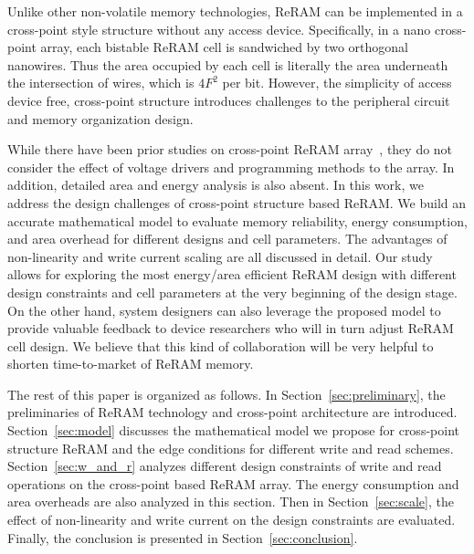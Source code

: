 Unlike other non-volatile memory technologies, ReRAM can be implemented in
a cross-point style structure without any access device. Specifically, in
a nano cross-point array, each bistable ReRAM cell is sandwiched by two
orthogonal nanowires. Thus the area occupied by each cell is literally the
area underneath the intersection of wires, which is $4F^2$ per bit.
However, the simplicity of access device free, cross-point structure
introduces challenges to the peripheral circuit and memory organization
design.

While there have been prior studies on cross-point ReRAM
array~\cite{crossbar_NANO2002_Ziegler,crossbar_NANO08_Flocke,crossbar_TED_2010,crossbar_NANO2003_Ziegler},
they do not consider the effect of voltage drivers and programming methods
to the array. In addition, detailed area and energy analysis is also
absent. In this work, we address the design challenges of cross-point
structure based ReRAM. We build an accurate mathematical model to evaluate
memory reliability, energy consumption, and area overhead for different
designs and cell parameters. The advantages of non-linearity and write
current scaling are all discussed in detail. Our study allows for
exploring the most energy/area efficient ReRAM design with different
design constraints and cell parameters at the very beginning of the design
stage. On the other hand, system designers can also leverage the proposed
model to provide valuable feedback to device researchers who will in turn
adjust ReRAM cell design. We believe that this kind of collaboration will
be very helpful to shorten time-to-market of ReRAM memory.

The rest of this paper is organized as follows. In
Section~\ref{sec:preliminary}, the preliminaries of ReRAM technology and
cross-point architecture are introduced. Section~\ref{sec:model} discusses
the mathematical model we propose for cross-point structure ReRAM and the
edge conditions for different write and read schemes.
Section~\ref{sec:w_and_r} analyzes different design constraints of write
and read operations on the cross-point based ReRAM array. The energy
consumption and area overheads are also analyzed in this section. Then in
Section~\ref{sec:scale}, the effect of non-linearity and write current on
the design constraints are evaluated. Finally, the conclusion is presented
in Section~\ref{sec:conclusion}.
